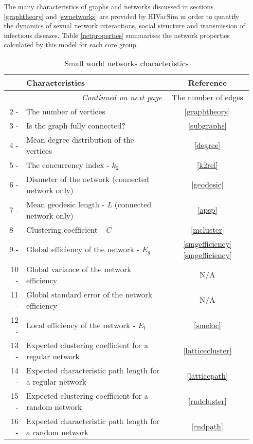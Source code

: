 The many characteristics of graphs and networks discussed in sections \ref{graphtheory}
and \ref{swnetworks} are provided by HIVacSim in order to quantify the dynamics of sexual
network interactions, social structure and transmission of infectious diseases. Table
\ref{netproperties} summarises the network properties calculated by this model for each
core group.

\begin{longtable}[c]{|r l|c|}
\caption{Small world networks characteristics }\\ \hline
& \bfseries Characteristics & \bfseries Reference \\\hline\hline
\endhead
\multicolumn{2}{r}{\emph{Continued on next page}}
\endfoot
\endlastfoot
\label{netproperties}
1 -& The number of edges                                             & \ref{graphtheory} \\\hline
2 -& The number of vertices                                          & \ref{graphtheory} \\\hline
3 -& Is the graph fully connected?                                   & \ref{subgraphs} \\\hline
4 -& Mean degree distribution of the vertices                        & \ref{degree} \\\hline
5 -& The concurrency index - $k_2$                                   & \ref{k2rel} \\\hline
6 -& Diameter of the network (connected network only)                & \ref{geodesic} \\\hline
7 -& Mean geodesic length - \emph{L} (connected network only)        & \ref{apsp} \\\hline
8 -& Clustering coefficient - \emph{C}                               & \ref{mcluster} \\\hline
9 -& Global efficiency of the network - $E_g$                        & \ref{smgefficiency}\ref{smgefficiency}\\\hline
10 -& Global variance of the network efficiency                      & N/A \\\hline
11 -& Global standard error of the network efficiency                & N/A \\\hline
12 -& Local  efficiency of the network - $E_l$                       & \ref{smeloc}\\\hline
13 -& Expected clustering coefficient for a regular network          & \ref{latticecluster}\\\hline
14 -& Expected characteristic path length for a regular network      & \ref{latticepath}\\\hline
15 -& Expected clustering coefficient for a random network           & \ref{rndcluster}\\\hline
16 -& Expected characteristic path length for a random network       & \ref{rndpath}\\\hline
\end{longtable}


